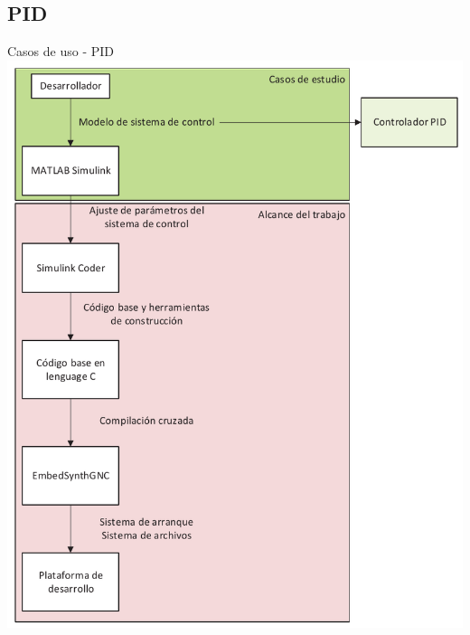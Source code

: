 \documentclass[10pt,aspectratio=169]{beamer} %
\begin{document}
\subsection{PID}
\begin{frame}{Casos de uso - PID}
  \centering
  \includegraphics[scale=0.4]{Diagrama_general_del_proyecto/dgp_ce_1.pdf}
\end{frame}
\end{document}
